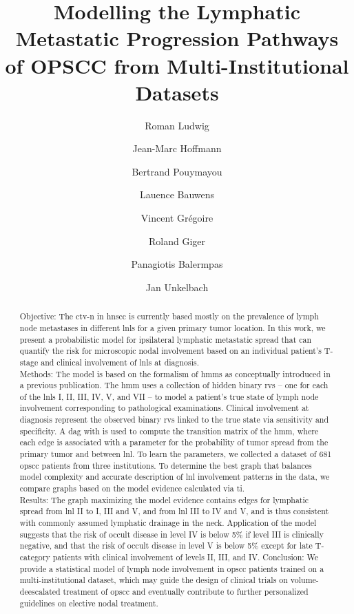 \documentclass[twocolumn]{aastex631}
\begin{document}
\title{Modelling the Lymphatic Metastatic Progression Pathways of OPSCC from Multi-Institutional Datasets}


\author{Roman Ludwig}
\author{Jean-Marc Hoffmann}
\author{Bertrand Pouymayou}
\author{Lauence Bauwens}
\author{Vincent Grégoire}
\author{Roland Giger}
\author{Panagiotis Balermpas}
\author{Jan Unkelbach}

\begin{abstract}
    Objective: The \gls{ctv-n} in \gls{hnscc} is currently based mostly on the prevalence of lymph node metastases in different \glspl{lnl} for a given primary tumor location. In this work, we present a probabilistic model for ipsilateral lymphatic metastatic spread that can quantify the risk for microscopic nodal involvement based on an individual patient's T-stage and clinical involvement of \glspl{lnl} at diagnosis. \\
    Methods: The model is based on the formalism of \glspl{hmm} as conceptually introduced in a previous publication. The \gls{hmm} uses a collection of hidden binary \glspl{rv} -- one for each of the \glspl{lnl} I, II, III, IV, V, and VII -- to model a patient's true state of lymph node involvement corresponding to pathological examinations. Clinical involvement at diagnosis represent the observed binary \glspl{rv} linked to the true state via sensitivity and specificity. A \gls{dag} with is used to compute the transition matrix of the \gls{hmm}, where each edge is associated with a parameter for the probability of tumor spread from the primary tumor and between \gls{lnl}. To learn the parameters, we collected a dataset of 681 \gls{opscc} patients from three institutions. To determine the best graph that balances model complexity and accurate description of \gls{lnl} involvement patterns in the data, we compare graphs based on the model evidence calculated via \gls{ti}. \\
    Results: The graph maximizing the model evidence contains edges for lymphatic spread from \gls{lnl} II to I, III and V, and from \gls{lnl} III to IV and V, and is thus consistent with commonly assumed lymphatic drainage in the neck. Application of the model suggests that the risk of occult disease in level IV is below 5\% if level III is clinically negative, and that the risk of occult disease in level V is below 5\% except for late T-category patients with clinical involvement of levels II, III, and IV. 
    Conclusion: We provide a statistical model of lymph node involvement in \gls{opscc} patients trained on a multi-institutional dataset, which may guide the design of clinical trials on volume-deescalated treatment of \gls{opscc} and eventually contribute to further personalized guidelines on elective nodal treatment.

\end{abstract}
\end{document}

